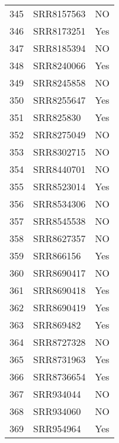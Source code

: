 \begin{table}[ht]
\begin{tabular}{rll}
  345 & SRR8157563 & NO \\ 
  346 & SRR8173251 & Yes \\ 
  347 & SRR8185394 & NO \\ 
  348 & SRR8240066 & Yes \\ 
  349 & SRR8245858 & NO \\ 
  350 & SRR8255647 & Yes \\ 
  351 & SRR825830 & Yes \\ 
  352 & SRR8275049 & NO \\ 
  353 & SRR8302715 & NO \\ 
  354 & SRR8440701 & NO \\ 
  355 & SRR8523014 & Yes \\ 
  356 & SRR8534306 & NO \\ 
  357 & SRR8545538 & NO \\ 
  358 & SRR8627357 & NO \\ 
  359 & SRR866156 & Yes \\ 
  360 & SRR8690417 & NO \\ 
  361 & SRR8690418 & Yes \\ 
  362 & SRR8690419 & Yes \\ 
  363 & SRR869482 & Yes \\ 
  364 & SRR8727328 & NO \\ 
  365 & SRR8731963 & Yes \\ 
  366 & SRR8736654 & Yes \\ 
  367 & SRR934044 & NO \\ 
  368 & SRR934060 & NO \\ 
  369 & SRR954964 & Yes \\ 
   \hline
\end{tabular}
\end{table}
